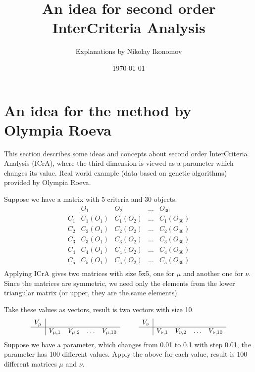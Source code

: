 \documentclass[12pt, a4paper]{article}
\begin{document}
\title{\textbf{\Large An idea for second order InterCriteria Analysis}}
\author{Explanations by Nikolay Ikonomov}
\date{\today}
\maketitle


\section{An idea for the method by Olympia Roeva}

This section describes some ideas and concepts about second order InterCriteria Analysis (ICrA),
where the third dimension is viewed as a parameter which changes its value.
Real world example (data based on genetic algorithms) provided by Olympia Roeva.

Suppose we have a matrix with 5 criteria and 30 objects.
\[ \begin{array}{c|cccc}
& O_1 & O_2 & \ldots & O_{30} \\
\hline
C_1 & C_1(O_1) & C_1(O_2) & \ldots & C_1(O_{30}) \\
C_2 & C_2(O_1) & C_2(O_2) & \ldots & C_2(O_{30}) \\
C_3 & C_3(O_1) & C_3(O_2) & \ldots & C_3(O_{30}) \\
C_4 & C_4(O_1) & C_4(O_2) & \ldots & C_4(O_{30}) \\
C_5 & C_5(O_1) & C_5(O_2) & \ldots & C_5(O_{30}) \\
\end{array} \]
Applying ICrA gives two matrices with size 5x5, one for $\mu$ and another one for $\nu$.
Since the matrices are symmetric, we need only the elements from the lower triangular matrix
(or upper, they are the same elements).

Take these values as vectors, result is two vectors with size 10.
\[ \begin{array}{c|ccccccc|cccc}
V_\mu & & & & & & & V_\nu & & & & \\
\cline{1-5} \cline{8-12}
& V_{\mu,1} & V_{\mu,2} & \ldots & V_{\mu,10} & \mbox{ } & \mbox{ } & & V_{\nu,1} & V_{\nu,2} & \ldots & V_{\nu,10} \\
\end{array} \]
Suppose we have a parameter, which changes from 0.01 to 0.1 with step 0.01, the parameter has 100 different values.
Apply the above for each value, result is 100 different matrices $\mu$ and $\nu$.
\end{document}
